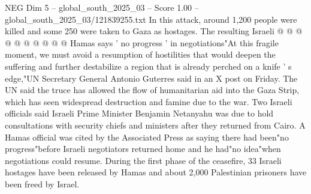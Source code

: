 \begin{textsample}{NEG Dim 5 – global\_south\_2025\_03 – Score 1.00 – global\_south\_2025\_03/121839255.txt}
In this attack, around 1,200 people were killed and some 250 were taken to Gaza as hostages.
The resulting Israeli @ @ @ @ @ @ @ @ @ @ Hamas says ' no progress ' in negotiations"At this fragile moment, we must avoid a resumption of hostilities that would deepen the suffering and further destabilize a region that is already perched on a knife ' s edge,"UN Secretary General Antonio Guterres said in an X post on Friday.
The UN said the truce has allowed the flow of humanitarian aid into the Gaza Strip, which has seen widespread destruction and famine due to the war.
Two Israeli officials said Israeli Prime Minister Benjamin Netanyahu was due to hold consultations with security chiefs and ministers after they returned from Cairo.
A Hamas official was cited by the Associated Press as saying there had been"no progress"before Israeli negotiators returned home and he had"no idea"when negotiations could resume.
During the first phase of the ceasefire, 33 Israeli hostages have been released by Hamas and about 2,000 Palestinian prisoners have been freed by Israel.

\end{textsample}
